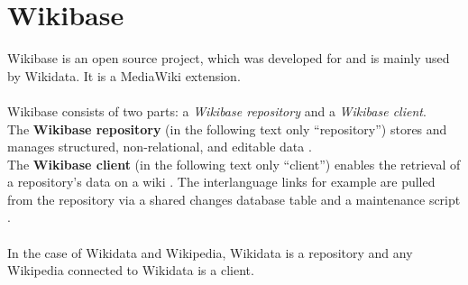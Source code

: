 \section{Wikibase}
Wikibase is an open source project, which was developed for and is mainly used by Wikidata. It is a MediaWiki extension. \\
\\
Wikibase consists of two parts: a \textit{Wikibase repository} and a \textit{Wikibase client}. \\
The \textbf{Wikibase repository} (in the following text only ``repository'')  stores and manages structured, non-relational, and editable data \citep{wikibase:01}. \\
The \textbf{Wikibase client} (in the following text only ``client'') enables the retrieval of a repository's data on a wiki \citep{wikibase:01}. The interlanguage links for example are pulled from the repository via a shared changes database table and a maintenance script \citep{wiki:18}. \\
\\
In the case of Wikidata and Wikipedia, Wikidata is a repository and any Wikipedia connected to Wikidata is a client.